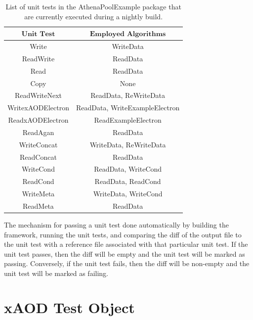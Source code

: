 \begin{table}[h]
    \centering
    \begin{tabular}{|c|c|}
        \hline
        $\textbf{Unit Test}$ & $\textbf{Employed Algorithms}$ \\
        \hline
        Write & WriteData \\
        \hline
        ReadWrite & ReadData \\
        \hline
        Read & ReadData \\
        \hline
        Copy & None \\
        \hline
        ReadWriteNext & ReadData, ReWriteData \\
        \hline
        WritexAODElectron & ReadData, WriteExampleElectron \\
        \hline
        ReadxAODElectron & ReadExampleElectron \\
        \hline
        ReadAgan & ReadData \\
        \hline
        WriteConcat & WriteData, ReWriteData \\
        \hline
        ReadConcat & ReadData \\
        \hline
        WriteCond & ReadData, WriteCond \\
        \hline
        ReadCond & ReadData, ReadCond \\
        \hline
        WriteMeta & WriteData, WriteCond \\
        \hline
        ReadMeta & ReadData \\
        \hline
    \end{tabular}
    \caption{List of unit tests in the AthenaPoolExample package that are currently executed during a nightly build.}
    \label{tab:CI_Unit_Tests}
\end{table}


The mechanism for passing a unit test done automatically by building the framework, running the unit tests, and comparing the diff of the output file to the unit test with a reference file associated with that particular unit test. 
If the unit test passes, then the diff will be empty and the unit test will be marked as passing.
Conversely, if the unit test fails, then the diff will be non-empty and the unit test will be marked as failing.

\section{xAOD Test Object}
\label{sec:Mod_utests_xAOD_object}

